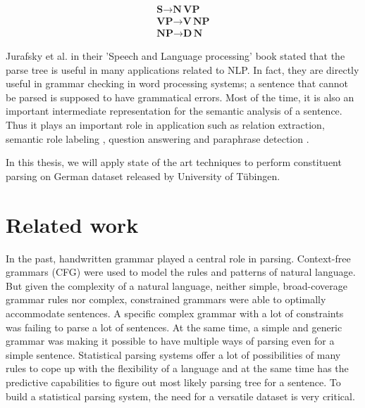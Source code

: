 \documentclass[a4paper, 11pt]{article}
\begin{document}
\begin{align*}
\textbf{S} \rightarrow \textbf{N} \, \textbf{VP} \\
\textbf{VP} \rightarrow \textbf{V} \, \textbf{NP} \\
\textbf{NP} \rightarrow \textbf{D} \, \textbf{N} 
\end{align*}

Jurafsky et al. \parencite{Jurafsky2008} in their 'Speech and Language processing' book stated that the parse tree is useful in many applications related to NLP. In fact, they are directly useful in grammar checking in word processing systems; a sentence that cannot be parsed is supposed to have grammatical errors. Most of the time, it is also an important intermediate representation for the semantic analysis of a sentence. Thus it plays an important role in application such as relation extraction, semantic role labeling \parencite{Gildea:2002:NPP:1073083.1073124}, question answering and paraphrase detection \parencite{Callison-Burch2010}.


In this thesis, we will apply state of the art techniques to perform constituent parsing on German dataset released by University of Tübingen.


\pagebreak
\section{Related work}

In the past, handwritten grammar played a central role in parsing. Context-free grammars (CFG) were used to model the rules and patterns of natural language. But given the complexity of a natural language, neither simple, broad-coverage grammar rules nor complex, constrained grammars were able to optimally accommodate sentences. A specific complex grammar with a lot of constraints was failing to parse a lot of sentences. At the same time, a simple and generic grammar was making it possible to have multiple ways of parsing even for a simple sentence. Statistical parsing systems offer a lot of possibilities of many rules to cope up with the flexibility of a language and at the same time has the predictive capabilities to figure out most likely parsing tree for a sentence. To build a statistical parsing system, the need for a versatile dataset is very critical. 
\end{document}
